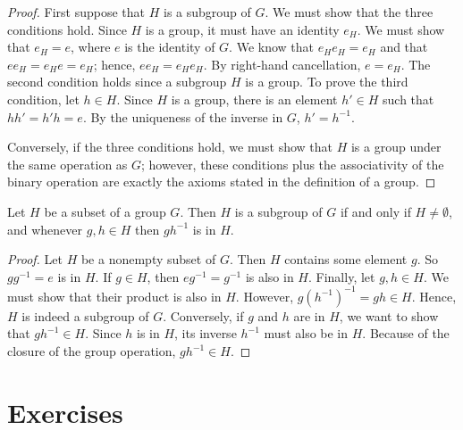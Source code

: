  
\begin{proof}
First suppose that $H$ is a subgroup of $G$.  We must show that the three conditions hold.  Since $H$ is a group, it must have an identity $e_H$.  We must show that $e_H = e$, where $e$ is the identity of $G$. We know that $e_H e_H = e_H$ and that $ee_H = e_H e = e_H$; hence, $ee_H = e_H e_H$.  By right-hand cancellation, $e =e_H$.  The second condition holds since a subgroup $H$ is a group.  To prove the third condition, let $h \in H$.  Since $H$ is a group, there is  an element $h' \in H$ such that $hh' = h'h = e$.  By the uniqueness  of the inverse in $G$, $h' = h^{-1}$.

Conversely, if the three conditions hold, we must show that $H$ is a group under the same operation as $G$; however, these conditions plus the associativity of the binary operation are exactly the axioms stated in the definition of a group.
\end{proof}

\begin{proposition}
Let $H$ be a subset of a group $G$.  Then $H$ is a subgroup of $G$ if and only if $H \neq \emptyset$, and whenever $g, h \in H$ then $gh^{-1}$ is in $H$. 
\end{proposition}
 
 
\begin{proof}
Let $H$ be a nonempty subset of $G$.  Then $H$ contains some element $g$.  So $gg^{-1} = e$ is in $H$.  If $g \in H$, then $eg^{-1} = g^{-1}$ is also in $H$. Finally, let $g, h \in H$. We must show that their product is also in $H$.  However, $g(h^{-1})^{-1} = gh \in H$.  Hence, $H$ is indeed a subgroup of $G$. Conversely, if $g$ and $h$ are in $H$, we want to show that $gh^{-1} \in H$.  Since $h$ is in $H$, its inverse $h^{-1}$ must also be in $H$.  Because of the closure of the group operation, $gh^{-1} \in H$. 
\end{proof}
 
 
\section*{Exercises}
\exrule

